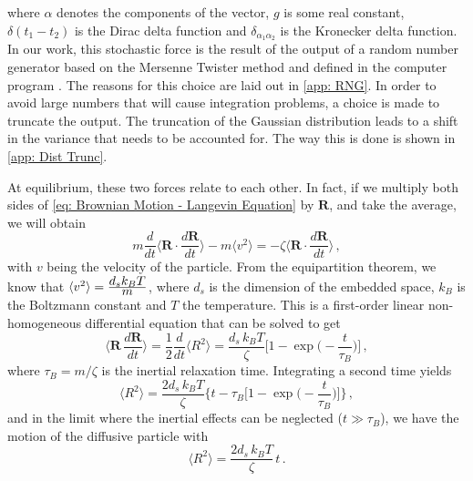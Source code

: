 \documentclass[../../main.tex]{subfiles}
\begin{document}
    where $\alpha$ denotes the components of the vector, $g$ is some real constant, $\delta(t_1 - t_2)$ is the Dirac delta function and $\delta_{{\alpha_1}{\alpha_2}}$ is the Kronecker delta function. In our work, this stochastic force is the result of the output of a random number generator based on the Mersenne Twister method and defined in the computer program \cite{matsumotoMersenneTwister623dimensionally1998}. The reasons for this choice are laid out in \cref{app: RNG}. In order to avoid large numbers that will cause integration problems, a choice is made to truncate the output. The truncation of the Gaussian distribution leads to a shift in the variance that needs to be accounted for. The way this is done is shown in \cref{app: Dist Trunc}. 

    At equilibrium, these two forces relate to each other. In fact, if we multiply both sides of \cref{eq: Brownian Motion - Langevin Equation} by $\mathbf{R}$, and take the average, we will obtain
        \begin{equation}
            m\frac{d}{dt} \Big\langle \mathbf{R} \cdot \frac{d\mathbf{R}}{dt} \Big\rangle - m\langle v^2 \rangle = -\zeta \Big\langle \mathbf{R}\cdot\frac{d\mathbf{R}}{dt} \Big\rangle \,,
        \end{equation}
    with $v$ being the velocity of the particle. From the equipartition theorem, we know that $\langle v^2 \rangle = \frac{\displaystyle d_s k_B T}{\displaystyle m}$, where $d_s$ is the dimension of the embedded space, $k_B$ is the Boltzmann constant and $T$ the temperature. This is a first-order linear non-homogeneous differential equation that can be solved to get
        \begin{equation}
            \Big\langle \mathbf{R}\,\frac{d\mathbf{R}}{dt} \Big\rangle = \frac{1}{2}\frac{d}{dt}\langle R^2 \rangle = \frac{d_s\,k_B T}{\zeta} \bigg[ 1-\exp \Big(-\frac{t}{\tau_B}\Big) \bigg] \,,
        \end{equation}
    where $\tau_B = m/\zeta$ is the inertial relaxation time. Integrating a second time yields
        \begin{equation}
            \langle R^2 \rangle = \frac{2d_s\, k_B T}{\zeta} \Bigg\{ t - \tau_B \bigg[ 1 - \exp \bigg(-\frac{t}{\tau_B} \bigg) \bigg]\Bigg\} \,,
        \end{equation}
    and in the limit where the inertial effects can be neglected ($t \gg \tau_B$), we have the motion of the diffusive particle with
        \begin{equation}\label{eq: Brownian Motion - t>>tau}
            \langle R^2 \rangle = \frac{2d_s\, k_B T}{\zeta}\, t \,.
        \end{equation}
            
\end{document}
